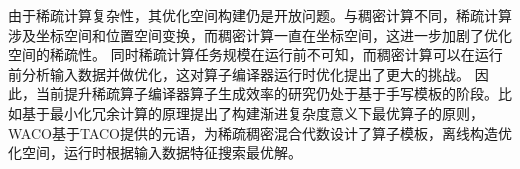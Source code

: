 由于稀疏计算复杂性，其优化空间构建仍是开放问题。与稠密计算不同，稀疏计算涉及坐标空间和位置空间变换，而稠密计算一直在坐标空间，这进一步加剧了优化空间的稀疏性\cite{senanayake:2020:scheduling}。
同时稀疏计算任务规模在运行前不可知，而稠密计算可以在运行前分析输入数据并做优化，这对算子编译器运行时优化提出了更大的挑战\cite{Dynamic-tiling}。
因此，当前提升稀疏算子编译器算子生成效率的研究仍处于基于手写模板的阶段。比如\cite{ahrens:2022:autoscheduling}基于最小化冗余计算的原理提出了构建渐进复杂度意义下最优算子的原则，
WACO\cite{WACO}基于TACO\cite{kjolstad:2017:taco}提供的元语，为稀疏稠密混合代数设计了算子模板，离线构造优化空间，运行时根据输入数据特征搜索最优解。